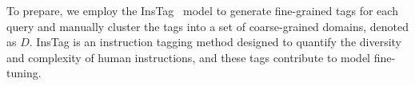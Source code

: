 To prepare, we employ the InsTag~\cite{lu2023instag} model to generate fine-grained tags for each query and manually cluster the tags into a set of coarse-grained domains, denoted as \( D \). 
InsTag is an instruction tagging method designed to quantify the diversity and complexity of human instructions, and these tags contribute to model fine-tuning.



